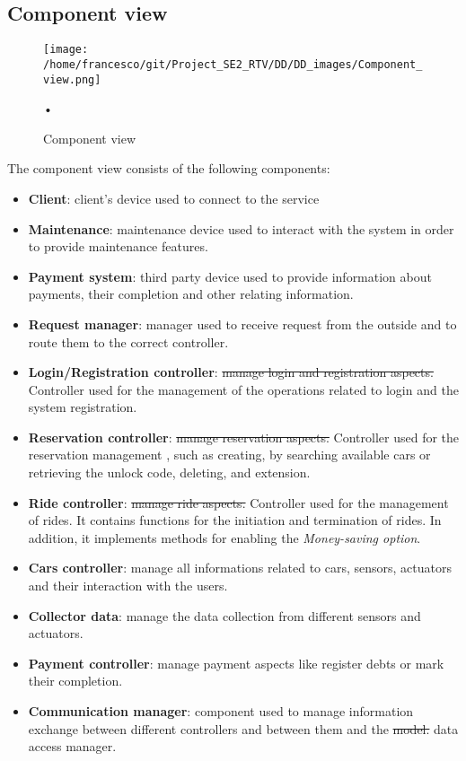 \documentclass[10pt, a4paper,titlepage]{article}
\begin{document}
\subsection{Component view}
\begin{figure}[h]
\begin{center}
\texttt{[image: /home/francesco/git/Project\_SE2\_RTV/DD/DD\_images/Component\_view.png]}
\caption{Component view}
\label{fig:component_view}
\end{center}•
\end{figure}
\clearpage
The component view consists of the following components:
\begin{itemize}
\item \textbf{Client}: client’s device used to connect to the service
\item \textbf{Maintenance}: maintenance device used to interact with the system in order to provide maintenance features.
\item \textbf{Payment system}: third party device used to provide information about payments, their completion and other relating information.
\item \textbf{Request manager}: manager used to receive request from the outside and to route them to the correct controller. 
\item \textbf{Login/Registration controller}: \sout{manage login and registration aspects.} Controller used for the management of the operations related to login and the system registration.
\item \textbf{Reservation controller}: \sout{manage reservation aspects.} Controller used for the reservation management , such as creating, by searching available cars or retrieving the unlock code, deleting, and extension.
\item \textbf{Ride controller}: \sout{manage ride aspects.} Controller used for the management of rides. It contains functions for the initiation and termination of rides. In addition, it implements methods for enabling the \emph{Money-saving option}.
\item \textbf{Cars controller}: manage all informations related to cars, sensors, actuators and their interaction with the users.
\item \textbf{Collector data}: manage the data collection from different sensors and actuators.
\item \textbf{Payment controller}: manage payment aspects like register debts or mark their completion.
\item \textbf{Communication manager}: component used to manage information exchange between different controllers and between them and the \sout{model.} data access manager.

\end{itemize}
\end{document}
